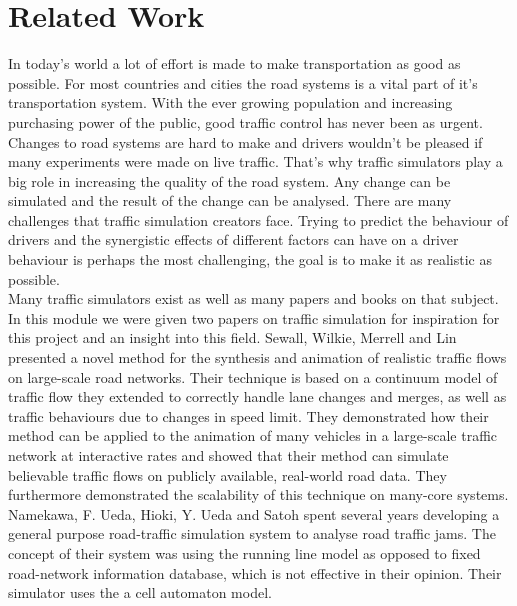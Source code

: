 \documentclass[11pt]{article}
\begin{document}
\section{Related Work}
\indent\indent In today's world a lot of effort is made to make transportation as good as possible. For most countries and cities the road systems is a vital part of it's transportation system. With the ever growing population and increasing purchasing power of the public, good traffic control has never been as urgent. Changes to road systems are hard to make and drivers wouldn't be pleased if many experiments were made on live traffic. That's why traffic simulators play a big role in increasing the quality of the road system. Any change can be simulated and the result of the change can be analysed. There are many challenges that traffic simulation creators face. Trying to predict the behaviour of drivers and the synergistic effects of different factors can have on a driver behaviour is perhaps the most challenging, the goal is to make it as realistic as possible.\\

Many traffic simulators exist as well as many papers and books on that subject. In this module we were given two papers on traffic simulation for inspiration for this project and an insight into this field. Sewall, Wilkie, Merrell and Lin \cite{sewall2010continuum}presented a novel method for the synthesis and animation of realistic traffic flows on large-scale road networks. Their technique is based on a continuum model of traffic flow they extended to correctly handle lane changes and merges, as well as traffic behaviours due to changes in speed limit. They demonstrated how their method can be applied to the animation of many vehicles in a large-scale traffic network at interactive rates and showed that their method can simulate believable traffic flows on publicly available, real-world road data. They furthermore demonstrated the scalability of this technique on many-core systems.\\

Namekawa, F. Ueda, Hioki, Y. Ueda and Satoh \cite{namekawa2005general} spent several years developing a general purpose road-traffic simulation system to analyse road traffic jams. The concept of their system was using the running line model as opposed to fixed road-network information database, which is not effective in their opinion. Their simulator uses the a cell automaton model.


\newpage	
\end{document}
